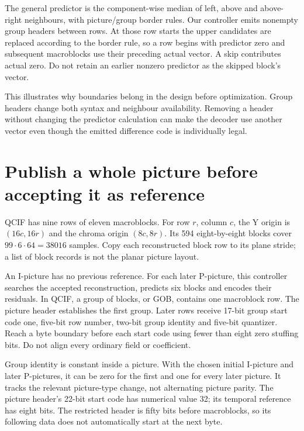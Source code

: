 The general predictor is the component-wise median of left, above and above-right
neighbours, with picture/group border rules. Our controller emits nonempty group
headers between rows. At those row starts the upper candidates are replaced
according to the border rule, so a row begins with predictor zero and subsequent
macroblocks use their preceding actual vector. A skip contributes actual zero.
Do not retain an earlier nonzero predictor as the skipped block's vector.

This illustrates why boundaries belong in the design before optimization.
Group headers change both syntax and neighbour availability. Removing a header
without changing the predictor calculation can make the decoder use another
vector even though the emitted difference code is individually legal.

\section{Publish a whole picture before accepting it as reference}

QCIF has nine rows of eleven macroblocks. For row $r$, column $c$, the Y origin
is $(16c,16r)$ and the chroma origin $(8c,8r)$. Its 594 eight-by-eight blocks
cover $99\cdot6\cdot64=38016$ samples. Copy each reconstructed block row to its
plane stride; a list of block records is not the planar picture layout.

An I-picture has no previous reference. For each later P-picture, this controller
searches the accepted reconstruction, predicts six blocks and encodes their
residuals. In QCIF, a group of blocks, or GOB, contains one macroblock row.
The picture header establishes the first group. Later rows receive
17-bit group start code one, five-bit row number, two-bit group identity and
five-bit quantizer. Reach a byte boundary before each start code using fewer
than eight zero stuffing bits. Do not align every ordinary field or coefficient.

Group identity is constant inside a picture. With the chosen initial I-picture
and later P-pictures, it can be zero for the first and one for every later picture.
It tracks the relevant picture-type change, not alternating picture parity.
The picture header's 22-bit start code has numerical value 32; its temporal
reference has eight bits. The restricted header is fifty bits before macroblocks,
so its following data does not automatically start at the next byte.

